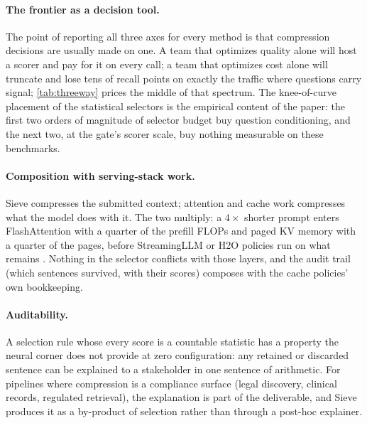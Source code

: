 \documentclass[review,12pt]{elsarticle}
\theoremstyle{remark}
\newcommand{\method}{Sieve}
\begin{document}
\paragraph{The frontier as a decision tool.}
The point of reporting all three axes for every method is that
compression decisions are usually made on one. A team that optimizes
quality alone will host a scorer and pay for it on every call; a team
that optimizes cost alone will truncate and lose tens of recall
points on exactly the traffic where questions carry signal;
\autoref{tab:threeway} prices the middle of that spectrum. The
knee-of-curve placement of the statistical selectors is the empirical
content of the paper: the first two orders of magnitude of selector
budget buy question conditioning, and the next two, at the gate's
scorer scale, buy nothing measurable on these benchmarks.

\paragraph{Composition with serving-stack work.}
\method{} compresses the submitted context; attention and cache work
compresses what the model does with it. The two multiply: a
$4\times$ shorter prompt enters FlashAttention
\citep{dao2022flashattention} with a quarter of the prefill FLOPs and
paged KV memory \citep{kwon2023vllm} with a quarter of the pages,
before StreamingLLM or H2O policies run on what remains
\citep{xiao2023streaming,zhang2023h2o}. Nothing in the selector
conflicts with those layers, and the audit trail (which sentences
survived, with their scores) composes with the cache policies' own
bookkeeping.

\paragraph{Auditability.}
A selection rule whose every score is a countable statistic has a
property the neural corner does not provide at zero configuration: any retained
or discarded sentence can be explained to a stakeholder in one
sentence of arithmetic. For pipelines where compression is a
compliance surface (legal discovery, clinical records, regulated
retrieval), the explanation is part of the deliverable, and \method{}
produces it as a by-product of selection rather than through a
post-hoc explainer.
\end{document}
